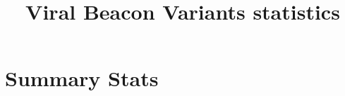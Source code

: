 \documentclass[a4paper, 10pt]{article}        %
\title{Viral Beacon Variants statistics}
\begin{document}
\date{}
\maketitle


\section{Summary Stats}



\end{document}
